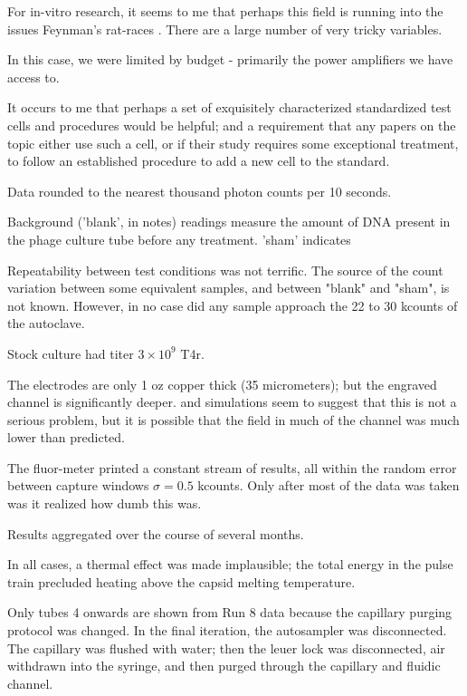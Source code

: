 \documentclass[paper.tex]{subfiles}
\begin{document}
For in-vitro research, it seems to me that perhaps this field is running into the issues Feynman's rat-races \cite{Cargo}. There are a large number of very tricky variables. 




 In this case, we were limited by budget - primarily the power amplifiers we have access to.

It occurs to me that perhaps a set of exquisitely characterized standardized test cells and procedures would be helpful; and a requirement that any papers on the topic either use such a cell, or if their study requires some exceptional treatment, to follow an established procedure to add a new cell to the standard. 


 Data rounded to the nearest thousand photon counts per 10 seconds. %

Background ('blank', in notes) readings measure the amount of DNA present in the phage culture tube before any treatment. 'sham' indicates 

Repeatability between test conditions was not terrific. The source of the  count variation between some equivalent samples, and between "blank" and "sham", is not known. However, in no case did any sample approach the 22 to 30 kcounts of the autoclave.

Stock culture had titer $3\times 10^9$ T4r.

The electrodes are only 1 oz copper thick (35 micrometers); but the engraved channel is significantly deeper. \cite{Nanosecond2006} and simulations seem to suggest that this is not a serious problem, but it is possible that the field in much of the channel was much lower than predicted.

The fluor-meter printed a constant stream of results, all within the random error between capture windows $\sigma=0.5$ kcounts. Only after most of the data was taken was it realized how dumb this was.

Results aggregated over the course of several months.

In all cases, a thermal effect was made implausible; the total energy in the pulse train precluded heating above the capsid melting temperature\cite{Effects1951}.

Only tubes 4 onwards are shown from Run 8 data because the capillary purging protocol was changed. In the final iteration, the autosampler was disconnected. The capillary was flushed with water; then the leuer lock was disconnected, air withdrawn into the syringe, and then purged through the capillary and fluidic channel.
\end{document}
